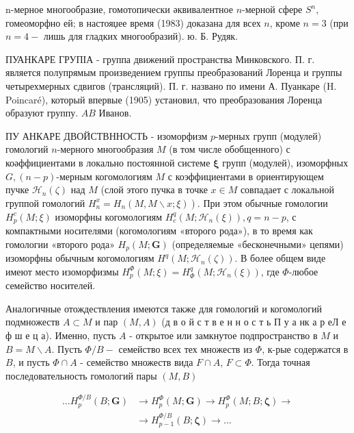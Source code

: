 \documentclass[10pt]{article}
\begin{document}
n-мерное многообразие, гомотопически әквивалентное $n$-мерной сфере $S^{n}$, гомеоморфно ей; в настояџее время (1983) доказана для всех $n$, кроме $n=3$ (при $n=4-$ лишь для гладких многообразий). ю. Б. Рудяк.



ПУАНКАРЕ ГРУПІА - группа движений пространства Минковского. П. г. является полупрямым произведением группы преобразований Лоренца и группы четырехмерных сдвигов (трансляций). П. г. названо по имени А. Пуанкаре (H. Poincaré), который впервые (1905) установил, что преобразования Лоренца образуют группу. $A B$ Иванов.



ПУ АНКАРЕ ДВОЙСТВННОСТЬ - изоморфизм $p$-мерных групп (модулей) гомологий $n$-мерного многообразия $M$ (в том числе обобщенного) с коәффициентами в локально постоянной системе $\boldsymbol{\xi}$ групп (модулей), изоморфных $G,(n-p)$-мерным когомологиям $M$ с коэффициентами в ориентирующем пучке $\mathscr{H}_{n}(\zeta)$ над $M$ (слой этого пучка в точке $x \in M$ совпадает с локальной группой гомологий $\left.H_{n}^{x}=H_{n}(M, M \backslash x ; \xi)\right)$. При этом обычные гомологии $H_{p}^{c}(M ; \xi)$ изоморфны когомологиям $H_{c}^{q}\left(M ; \mathscr{H}_{n}(\xi)\right), q=n-p$, с компактными носителями (когомологиям «второго рода»), в то время как гомологии «второго рода» $H_{p}(M ; \boldsymbol{G})$ (определяемые «бесконечными» цепями) изоморфны обычным когомологиям $H^{q}\left(M ; \mathscr{H}_{n}(\zeta)\right)$. В более общем виде имеют место изоморфизмы $H_{p}^{\Phi}(M ; \xi)=H_{\Phi}^{q}\left(M ; \mathscr{H}_{n}(\xi)\right)$, где $\Phi$-любое семейство носителей.



Аналогичные отождествления имеются также для гомологий и когомологий подмножеств $A \subset M$ и пар $(M, A)$ (д в о й с т в е н н о с т ь П у а нк а р еЛ е ф ш е ц а). Именно, пусть $A$ - открытое или замкнутое подпространство в $M$ и $B=M \backslash A$. Пусть $\Phi / B-$ семейство всех тех множеств из $\Phi$, к-рые содержатся в $B$, и пусть $\Phi \cap A$ - семейство множеств вида $F \cap A$, $F \subset \Phi$. Тогда точная последовательность гомологий пары $(M, B)$



\[

\begin{aligned}

\ldots H_{p}^{\Phi / B}(B ; \boldsymbol{G}) & \longrightarrow H_{p}^{\Phi}(M ; \boldsymbol{G}) \longrightarrow H_{p}^{\Phi}(M ; B ; \boldsymbol{\zeta}) \longrightarrow \\

& \longrightarrow H_{p-1}^{\Phi / B}(B ; \boldsymbol{\zeta}) \longrightarrow \ldots

\end{aligned}

\]
\end{document}

